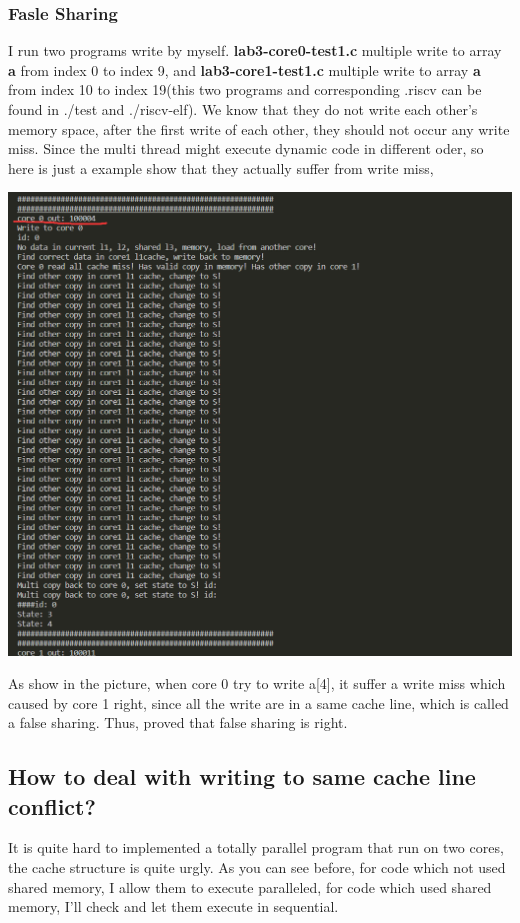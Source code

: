 \mathbb{R} \documentclass{article}
\begin{document}
\subsubsection{Fasle Sharing}
I run two programs write by myself. \textbf{lab3-core0-test1.c} multiple write to array \textbf{a} from index 0 to index 9, and \textbf{lab3-core1-test1.c} multiple write to array \textbf{a} from index 10 to index 19(this two programs and corresponding .riscv can be found in ./test and ./riscv-elf). We know that they do not write each other's memory space, after the first write of each other, they should not occur any write miss. Since the multi thread might execute dynamic code in different oder, so here is just a example show that they actually suffer from write miss,
\begin{center}
  \includegraphics[scale = 0.4]{13.png}
\end{center}
As show in the picture, when core 0 try to write a[4], it suffer a write miss which caused by core 1 right, since all the write are in a same cache line, which is called a false sharing. Thus, proved that false sharing is right.
\subsection{How to deal with writing to same cache line conflict?}
It is quite hard to implemented a totally parallel program that run on two cores, the cache structure is quite urgly. As you can see before, for code which not used shared memory, I allow them to execute paralleled, for code which used shared memory, I'll check and let them execute in sequential.
\end{document}
